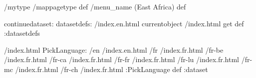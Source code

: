 \begin{ingrid}
/mytype /mappagetype def
/menu_name (East Africa) def

continuedataset:
datasetdefs:
/index.en.html currentobject /index.html get def
:datasetdefs

/index.html {
PickLanguage:
/en /index.en.html
/fr /index.fr.html
/fr-be /index.fr.html
/fr-ca /index.fr.html
/fr-fr /index.fr.html
/fr-lu /index.fr.html
/fr-mc /index.fr.html
/fr-ch /index.fr.html
:PickLanguage
} def
:dataset


\end{ingrid}
